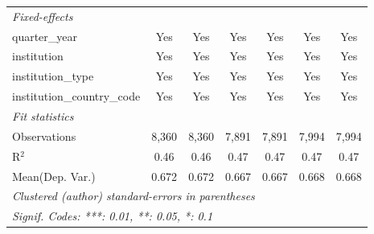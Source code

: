 \begin{tabular}{lcccccc}
   \midrule
   \emph{Fixed-effects}\\
   quarter\_year                      & Yes     & Yes      & Yes     & Yes         & Yes     & Yes\\  
   institution                        & Yes     & Yes      & Yes     & Yes         & Yes     & Yes\\  
   institution\_type                  & Yes     & Yes      & Yes     & Yes         & Yes     & Yes\\  
   institution\_country\_code         & Yes     & Yes      & Yes     & Yes         & Yes     & Yes\\  
   \midrule
   \emph{Fit statistics}\\
   Observations                       & 8,360   & 8,360    & 7,891   & 7,891       & 7,994   & 7,994\\  
   R$^2$                              & 0.46    & 0.46     & 0.47    & 0.47        & 0.47    & 0.47\\  
Mean(Dep. Var.) & 0.672 & 0.672 & 0.667 & 0.667 & 0.668 & 0.668 \\
   \midrule \midrule
   \multicolumn{7}{l}{\emph{Clustered (author) standard-errors in parentheses}}\\
   \multicolumn{7}{l}{\emph{Signif. Codes: ***: 0.01, **: 0.05, *: 0.1}}\\
\end{tabular}
\par\endgroup

